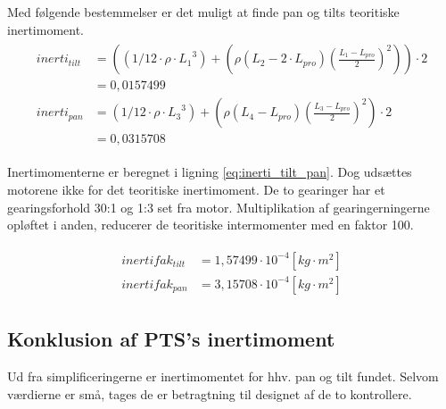 Med følgende bestemmelser er det muligt at finde pan og tilts teoritiske inertimoment.
\begin{align}
\label{eq:inerti_tilt_pan}
\begin{split}
{ inerti }_{ tilt } &= \left( \left( 1/12\cdot \rho \cdot { {L_{1}} }^{ 3 } \right) +\left( \rho \left( {L_{2}}-2\cdot {L_{pro}} \right) { \left( \frac { {L_{1}}-{L_{pro}}}{ 2 }  \right)  }^{ 2 } \right)  \right) \cdot 2
\\
 &= 0,0157499
\\
{ inerti }_{ pan }&=\left( 1/12\cdot \rho \cdot { { L }_{ 3 } }^{ 3 } \right) +\left( \rho \left( { L }_{ 4 }-{ L }_{ pro } \right) { \left( \frac { { L }_{ 3 }-{ L }_{ pro } }{ 2 }  \right)  }^{ 2 } \right) \cdot 2
\\
 &=0,0315708
\end{split}
\end{align}




Inertimomenterne er beregnet i ligning \ref{eq:inerti_tilt_pan}. Dog udsættes motorene ikke for det teoritiske inertimoment. De to gearinger har et gearingsforhold 30:1 og 1:3 set fra motor. Multiplikation af gearingerningerne opløftet i anden, reducerer de teoritiske intermomenter med en faktor 100.  

\begin{align*}
\label{eq:inerti_tilt_pan_fak}
\begin{split}
{inertifak_{tilt}}&=1,57499\cdot{10}^{-4} [kg \cdot {m}^{2}]
\\
{inertifak_{pan}}&=3,15708\cdot{10}^{-4} [kg \cdot {m}^{2}]
\end{split}
\end{align*}

\subsection{Konklusion af PTS's inertimoment}
Ud fra simplificeringerne er inertimomentet for hhv. pan og tilt fundet. Selvom værdierne er små, tages de er betragtning til designet af de to kontrollere.



